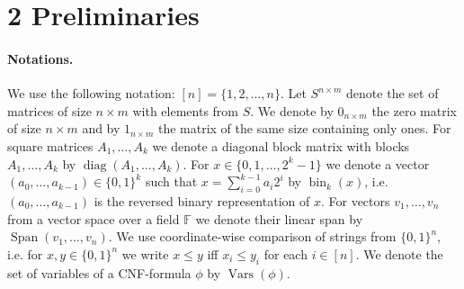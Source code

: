 \section*{2 Preliminaries}
\paragraph{Notations.} We use the following notation: $[n]=\{1,2,\ldots,n\}$. Let $S^{n\times m}$ denote the set of matrices of size $n\times m$ with elements from $S$. We denote by $0_{n\times m}$ the zero matrix of size $n\times m$ and by $1_{n\times m}$ the matrix of the same size containing only ones. For square matrices $A_1,\ldots,A_k$ we denote a diagonal block matrix with blocks $A_1,\ldots,A_k$ by $\operatorname{diag}(A_1,\ldots,A_k)$. For $x\in\{0,1,\ldots,2^k-1\}$ we denote a vector $(a_0,\ldots,a_{k-1})\in\{0,1\}^k$ such that $x=\sum_{i=0}^{k-1}a_i2^i$ by $\operatorname{bin}_k(x)$, i.e. $(a_0,\ldots,a_{k-1})$ is the reversed binary representation of $x$. For vectors $v_1,\ldots,v_n$ from a vector space over a field $\mathbb F$ we denote their linear span by $\operatorname{Span}(v_1,\ldots,v_n)$. We use coordinate-wise comparison of strings from $\{0,1\}^n$, i.e. for $x,y\in\{0,1\}^n$ we write $x\le y$ iff $x_i\le y_i$ for each $i\in[n]$. We denote the set of variables of a CNF-formula $\phi$ by $\operatorname{Vars}(\phi)$.
